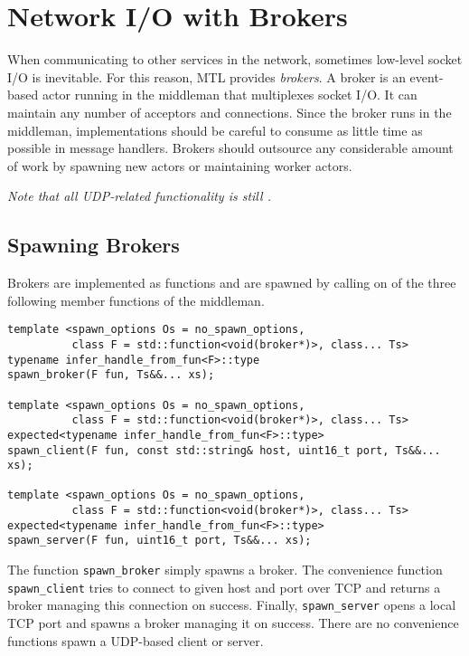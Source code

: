 \section{Network I/O with Brokers}
\label{broker}

When communicating to other services in the network, sometimes low-level socket
I/O is inevitable. For this reason, MTL provides \emph{brokers}. A broker is
an event-based actor running in the middleman that multiplexes socket I/O. It
can maintain any number of acceptors and connections. Since the broker runs in
the middleman, implementations should be careful to consume as little time as
possible in message handlers. Brokers should outsource any considerable amount
of work by spawning new actors or maintaining worker actors.

\textit{Note that all UDP-related functionality is still \experimental.}

\subsection{Spawning Brokers}

Brokers are implemented as functions and are spawned by calling on of the three
following member functions of the middleman.

\begin{lstlisting}
template <spawn_options Os = no_spawn_options,
          class F = std::function<void(broker*)>, class... Ts>
typename infer_handle_from_fun<F>::type
spawn_broker(F fun, Ts&&... xs);

template <spawn_options Os = no_spawn_options,
          class F = std::function<void(broker*)>, class... Ts>
expected<typename infer_handle_from_fun<F>::type>
spawn_client(F fun, const std::string& host, uint16_t port, Ts&&... xs);

template <spawn_options Os = no_spawn_options,
          class F = std::function<void(broker*)>, class... Ts>
expected<typename infer_handle_from_fun<F>::type>
spawn_server(F fun, uint16_t port, Ts&&... xs);
\end{lstlisting}

The function \lstinline^spawn_broker^ simply spawns a broker. The convenience
function \lstinline^spawn_client^ tries to connect to given host and port over
TCP and returns a broker managing this connection on success. Finally,
\lstinline^spawn_server^ opens a local TCP port and spawns a broker managing it
on success. There are no convenience functions spawn a UDP-based client or
server.

